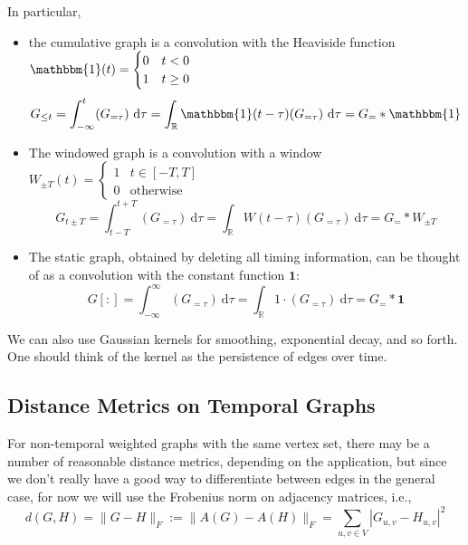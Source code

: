 \documentclass{article}
\theoremstyle{definition}
\begin{document}
	In particular,
	\begin{itemize}
		\item 
		 the cumulative graph is a convolution with the Heaviside function $\mathbbm{1}(t) = \begin{cases}
		0 & t < 0 \\ 1 & t \geq 0
		\end{cases}$
		\begin{equation*}
			G_{\leq t} = \int_{-\infty}^t (G_{=\tau} )~\mathrm d \tau  = \int_{\mathbb R} \mathbbm{1}(t - \tau) (G_{=\tau} )~\mathrm d \tau = G_{=} \ast \mathbbm{1} 
		\end{equation*}
		
		\item The windowed graph is a convolution with a window $W_{\pm T}(t) = \begin{cases} 1 & t \in [-T, T]\\ 0 & \text{otherwise}\end{cases}$
		\begin{equation*}
		G_{t \pm T} = \int_{t-T}^{t+T} (G_{=\tau} )~\mathrm d \tau  = \int_{\mathbb R} W(t- \tau) (G_{=\tau} )~\mathrm d \tau = G_{=} \ast W_{\pm T} 
		\end{equation*}	
		
		\item The static graph, obtained by deleting all timing information, can be thought of as a convolution with the constant function $\mathbf 1$:
		\begin{equation*}
			G[:] = \int_{-\infty}^{\infty} (G_{=\tau} )~\mathrm d \tau  = \int_{\mathbb R} 1 \cdot (G_{=\tau} )~\mathrm d \tau = G_{=} \ast \mathbf 1 
		\end{equation*}
	\end{itemize}
	We can also use Gaussian kernels for smoothing, exponential decay, and so forth. One should think of the kernel as the persistence of edges over time.
	
	\subsection{Distance Metrics on Temporal Graphs}
	For non-temporal weighted graphs with the same vertex set, there may be a number of reasonable distance metrics, depending on the application, but since we don't really have a good way to differentiate between edges in the general case, for now we will use the Frobenius norm on adjacency matrices, i.e.,
	\[ d(G,H) = \Big\lVert G - H \Big\rVert_F :=  \Big\lVert A(G) - A(H) \Big\rVert_F = \sum_{u,v \in V} | G_{u,v} - H_{u,v} |^2 \]
	
\end{document}
